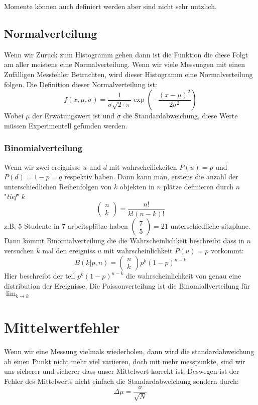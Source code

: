 \documentclass{article}
\begin{document}
Momente können auch definiert werden aber sind nicht sehr nutzlich.
\hypertarget{Normalverteilung}{\subsection*{Normalverteilung}}
Wenn wir Zuruck zum Histogramm gehen dann ist die Funktion die diese Folgt am aller meistens eine Normalverteilung. Wenn wir viele Messungen mit einen Zufälligen Messfehler Betrachten, wird dieser Histogramm eine Normalverteilung folgen.
Die Definition dieser Normalverteilung ist:
\[f(x,\mu,\sigma)=\frac{1}{\sigma\sqrt{2\cdot\pi}}\exp\left(-\frac{(x-\mu)^2}{2\sigma^2}\right)\]
Wobei $\mu$ der Erwatungswert ist und $\sigma$ die Standardabweichung, diese Werte müssen Experimentell gefunden werden.
\hypertarget{Binomialverteilung}{\subsubsection*{Binomialverteilung}}
Wenn wir zwei ereignisse $u$ und $d$ mit wahrscheilickeiten $P(u)=p$ und $P(d)=1-p=q$ respektiv haben. Dann kann man, erstens die anzahl der unterschiedlichen Reihenfolgen von $k$ objekten in $n$ plätze definieren durch $n$ "\textit{tief}" $k$\[\begin{pmatrix}n\\k\end{pmatrix}=\frac{n!}{k!(n-k)!}\] z.B. $5$ Studente in $7$ arbeitsplätze haben $\begin{pmatrix}7\\5\end{pmatrix}=21$ unterschiedliche sitzplane.
Dann kommt Binomialverteilung die die Wahrscheinlichkeit beschreibt dass in $n$ versuchen $k$ mal den ereigniss $u$ mit wahrscheinlichkeit $P(u)=p$ vorkommt:
\[B(k|p,n)=\begin{pmatrix}n\\k\end{pmatrix}p^k(1-p)^{n-k}\] Hier beschreibt der teil $p^k(1-p)^{n-k}$ die wahrscheinlichkeit von genau eine distribution der Ereignisse.
Die Poissonverteilung ist die Binomiallverteilung für $\lim_{k\rightarrow k}$
\hypertarget{mittelwertfehler}{\section*{Mittelwertfehler}}
Wenn wir eine Messung vielmals wiederholen, dann wird die standardabweichung ab einen Punkt nicht mehr viel variieren, doch mit mehr messpunkte, sind wir uns sicherer und sicherer dass unser Mittelwert korrekt ist. Deswegen ist der Fehler des Mittelwerts nicht einfach die Standardabweichung sondern durch:
\[\Delta \mu=\frac{\sigma}{\sqrt{N}}\]
\end{document}

